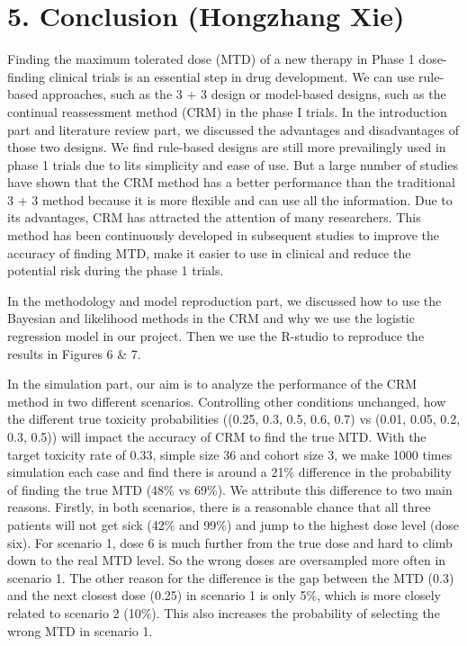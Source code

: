 \documentclass[
]{article}
\begin{document}
\hypertarget{conclusion-hongzhang-xie}{%
\section{5. Conclusion (Hongzhang Xie)}\label{conclusion-hongzhang-xie}}

Finding the maximum tolerated dose (MTD) of a new therapy in Phase 1
dose-finding clinical trials is an essential step in drug development.
We can use rule-based approaches, such as the 3 + 3 design or
model-based designs, such as the continual reassessment method (CRM) in
the phase I trials. In the introduction part and literature review part,
we discussed the advantages and disadvantages of those two designs. We
find rule-based designs are still more prevailingly used in phase 1
trials due to lits simplicity and ease of use. But a large number of
studies have shown that the CRM method has a better performance than the
traditional 3 + 3 method because it is more flexible and can use all the
information. Due to its advantages, CRM has attracted the attention of
many researchers. This method has been continuously developed in
subsequent studies to improve the accuracy of finding MTD, make it
easier to use in clinical and reduce the potential risk during the phase
1 trials.

In the methodology and model reproduction part, we discussed how to use
the Bayesian and likelihood methods in the CRM and why we use the
logistic regression model in our project. Then we use the R-studio to
reproduce the results in Figures 6 \& 7.

In the simulation part, our aim is to analyze the performance of the CRM
method in two different scenarios. Controlling other conditions
unchanged, how the different true toxicity probabilities ((0.25, 0.3,
0.5, 0.6, 0.7) vs (0.01, 0.05, 0.2, 0.3, 0.5)) will impact the accuracy
of CRM to find the true MTD. With the target toxicity rate of 0.33,
simple size 36 and cohort size 3, we make 1000 times simulation each
case and find there is around a 21\% difference in the probability of
finding the true MTD (48\% vs 69\%). We attribute this difference to two
main reasons. Firstly, in both scenarios, there is a reasonable chance
that all three patients will not get sick (42\% and 99\%) and jump to
the highest dose level (dose six). For scenario 1, dose 6 is much
further from the true dose and hard to climb down to the real MTD level.
So the wrong doses are oversampled more often in scenario 1. The other
reason for the difference is the gap between the MTD (0.3) and the next
closest dose (0.25) in scenario 1 is only 5\%, which is more closely
related to scenario 2 (10\%). This also increases the probability of
selecting the wrong MTD in scenario 1.
\end{document}
